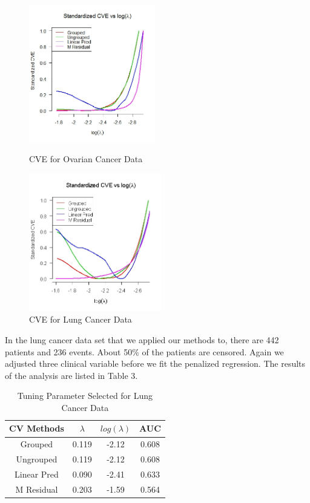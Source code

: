 \documentclass{article}\usepackage[]{graphicx}\usepackage[]{color}
\begin{document}
   \begin{figure}[h]
   \centering
    \begin{minipage}[b]{0.4\textwidth}
      \centering
		  \includegraphics[height= 6cm ]{./figures/07.jpeg}
      \caption{CVE for Ovarian Cancer Data}
     \end{minipage}
     \begin{minipage}[b]{0.4\textwidth}
      \centering
		  \includegraphics[height= 6cm ]{./figures/08.jpeg}
      \caption{CVE for Lung Cancer Data}
      \end{minipage}	
   \end{figure}	

In the lung cancer data set that we applied our methods to, there are 442 patients and 236 events. About 50$\%$ of the patients are censored. Again we adjusted three clinical variable before we fit the penalized regression. The results of the analysis are listed in Table 3.

			\begin{table}[h]
			\centering
			\begin{tabular}{ c | c | c | c}
				CV Methods & $\lambda$ & $log(\lambda)$ & AUC \\
				\hline \hline
				Grouped  &   0.119 & -2.12 &  0.608 \\
				Ungrouped &  0.119 & -2.12 &  0.608 \\
				Linear Pred &  0.090 & -2.41 &  0.633\\
				M Residual & 0.203 & -1.59 &  0.564
			\end{tabular}
			\caption{Tuning Parameter Selected for Lung Cancer Data}
			\end{table}
			
\end{document}
